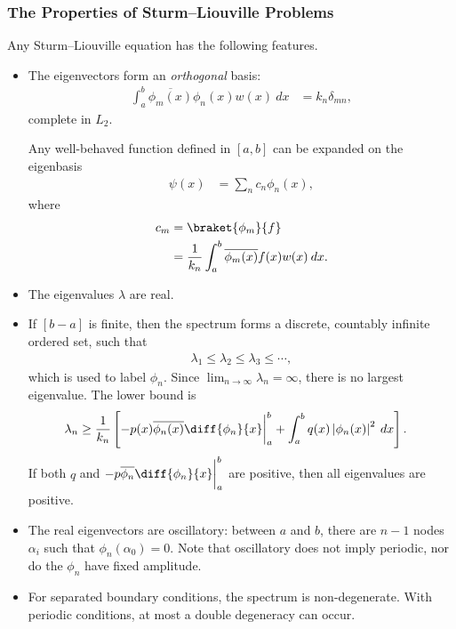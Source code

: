 \documentclass[10pt]{mypackage}
\begin{document}
  \subsubsection{The Properties of Sturm--Liouville Problems}%
  Any Sturm--Liouville equation has the following features.
  \begin{itemize}
    \item The eigenvectors form an \textit{orthogonal} basis:
      \begin{align*}
        \int_{a}^{b} \overline{\phi_m(x)}\phi_n(x)w(x)\:dx &= k_n\delta_{mn},
      \end{align*}
      complete in $L_2$.\newline

      Any well-behaved function defined in $[a,b]$ can be expanded on the eigenbasis
      \begin{align*}
        \psi(x) &= \sum_{n}c_n\phi_n(x),
      \end{align*}
      where
      \begin{align*}
        c_m &= \braket{\phi_m}{f}\\
            &= \frac{1}{k_n} \int_{a}^{b} \overline{\phi_m(x)}f(x)w(x)\:dx.
      \end{align*}
    \item The eigenvalues $\lambda$ are real.
    \item If $[b-a]$ is finite, then the spectrum forms a discrete, countably infinite ordered set, such that
      \begin{align*}
        \lambda_1 \leq \lambda_2 \leq \lambda_3 \leq \cdots,
      \end{align*}
      which is used to label $\phi_n$. Since $\lim_{n\rightarrow\infty}\lambda_n = \infty$, there is no largest eigenvalue. The lower bound is
      \begin{align*}
        \lambda_n &\geq \frac{1}{k_n} \left[ -p(x) \overline{\phi_n(x)} \diff{\phi_n}{x}\biggr\vert_{a}^{b} + \int_{a}^{b} q(x) \left\vert \phi_n(x) \right\vert^2\:dx \right].
      \end{align*}
      If both $q$ and $-p \overline{\phi_n}\diff{\phi_n}{x}\biggr\vert_{a}^{b}$ are positive, then all eigenvalues are positive.
    \item The real eigenvectors are oscillatory: between $a$ and $b$, there are $n-1$ nodes $\alpha_i$ such that $\phi_n\left( \alpha_0 \right) = 0$. Note that oscillatory does not imply periodic, nor do the $\phi_n$ have fixed amplitude.
    \item For separated boundary conditions, the spectrum is non-degenerate. With periodic conditions, at most a double degeneracy can occur.
  \end{itemize}
\end{document}

